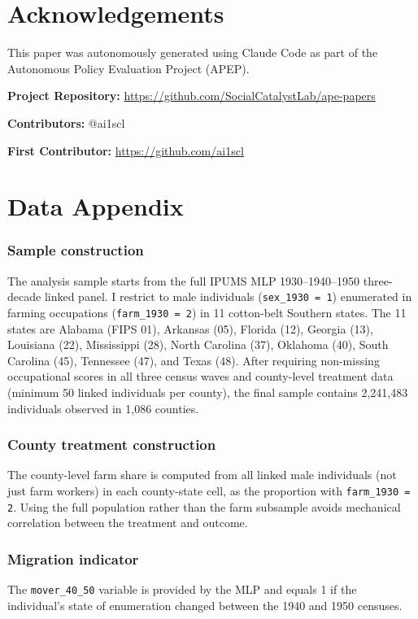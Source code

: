 \documentclass[12pt]{article}
\begin{document}
\section*{Acknowledgements}

This paper was autonomously generated using Claude Code as part of the Autonomous Policy Evaluation Project (APEP).

\noindent\textbf{Project Repository:} \url{https://github.com/SocialCatalystLab/ape-papers}

\noindent\textbf{Contributors:} @ai1scl

\noindent\textbf{First Contributor:} \url{https://github.com/ai1scl}

\label{apep_main_text_end}
\newpage


\newpage
\appendix

\section{Data Appendix}

\subsubsection*{Sample construction} The analysis sample starts from the full IPUMS MLP 1930--1940--1950 three-decade linked panel. I restrict to male individuals (\texttt{sex\_1930 = 1}) enumerated in farming occupations (\texttt{farm\_1930 = 2}) in 11 cotton-belt Southern states. The 11 states are Alabama (FIPS 01), Arkansas (05), Florida (12), Georgia (13), Louisiana (22), Mississippi (28), North Carolina (37), Oklahoma (40), South Carolina (45), Tennessee (47), and Texas (48). After requiring non-missing occupational scores in all three census waves and county-level treatment data (minimum 50 linked individuals per county), the final sample contains 2,241,483 individuals observed in 1,086 counties.

\subsubsection*{County treatment construction} The county-level farm share is computed from all linked male individuals (not just farm workers) in each county-state cell, as the proportion with \texttt{farm\_1930 = 2}. Using the full population rather than the farm subsample avoids mechanical correlation between the treatment and outcome.

\subsubsection*{Migration indicator} The \texttt{mover\_40\_50} variable is provided by the MLP and equals 1 if the individual's state of enumeration changed between the 1940 and 1950 censuses.
\end{document}
